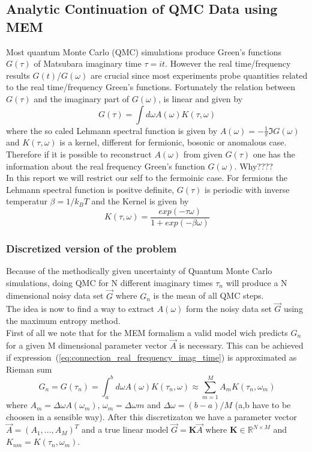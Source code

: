 \subsection{Analytic Continuation of QMC Data using MEM}

Most quantum Monte Carlo (QMC) simulations produce Green's functions $G(\tau)$ of Matsubara imaginary time $\tau = it$.
However the real time/frequency results $G(t)$/$G(\omega)$ are crucial since most experiments probe quantities related to 
the real time/frequency Green's functions. Fortunately the relation between $G(\tau)$ and the imaginary part of $G(\omega)$,
is linear and given by 
\begin{equation}\label{eq:connection_real_frequency_imag_time}
G(\tau) = \int d\omega A(\omega)K(\tau,\omega) 
\end{equation}
\noindent where the so caled Lehmann spectral function is given by $A(\omega) = -\frac{1}{\pi} \Im G(\omega)$ and $K(\tau,\omega)$ is a kernel, 
different for fermionic, bosonic or anomalous case. Therefore if it is possible to reconstruct $A(\omega)$ from given $G(\tau)$
one has the information about the real frequency Green's function $G(\omega)$. Why???? \\
In this report we will restrict our self to the fermoinic case. For fermions the Lehmann spectral function is positve 
definite, $G(\tau)$ is periodic with inverse temperatur $\beta = 1 / k_B T$ and the Kernel is given by
\begin{equation}\label{eq:ferminoc_kernel}
 K(\tau,\omega) =  \frac{exp(-\tau \omega)}{1 + exp(-\beta \omega)}
\end{equation}

\subsubsection{Discretized version of the problem}

\noindent Because of the methodically given uncertainty of Quantum Monte Carlo simulations, doing QMC for N different imaginary 
times $\tau_n$ will produce a N dimensional noisy data set $\vec{G}$ where $G_n$ is the mean of all QMC steps.\\
The idea is now to find a way to extract $A(\omega)$ form the noisy data set $\vec{G}$ using the maximum entropy method.\\
First of all we note that for the MEM formalism a valid model wich predicts $G_n$ for a given M dimensional parameter vector
$\vec{A}$ is necessary. This can be achieved if expression~(\ref{eq:connection_real_frequency_imag_time}) is approximated
as Rieman sum 
\begin{equation}\label{eq:kernel_as_reiman_sum}
 G_n = G(\tau_n) = \int_{a}^{b} d \omega A(\omega)K(\tau_n,\omega) \approx \sum_{m=1}^M  A_m K(\tau_n,\omega_m)
\end{equation}
\noindent where $A_m = \Delta \omega A(\omega_m)$, $ \omega_m = \Delta \omega m$ and $\Delta \omega = (b-a)/M$ (a,b have to be choosen in a sensible way).
After this discretizaton we have a parameter vector $\vec{A} =(A_1,...,A_M)^T$ and a true linear model $\vec{G} = \textbf{K} 
\vec{A}$ where $\textbf{K} \in \mathbb{R}^{N\times M}$ and $K_{nm} = K(\tau_n,\omega_m)$.


